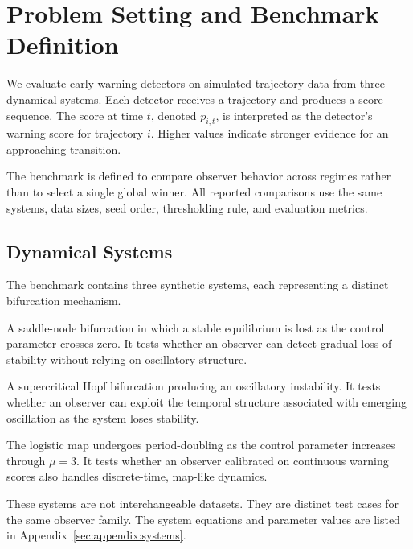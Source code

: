 \section{Problem Setting and Benchmark Definition}
\label{sec:problem}

We evaluate early-warning detectors on simulated trajectory data from three
dynamical systems. Each detector receives a trajectory and produces a score
sequence. The score at time \(t\), denoted \(p_{i,t}\), is interpreted as the
detector's warning score for trajectory \(i\). Higher values indicate stronger
evidence for an approaching transition.

The benchmark is defined to compare observer behavior across regimes rather
than to select a single global winner. All reported comparisons use the same
systems, data sizes, seed order, thresholding rule, and evaluation metrics.

\subsection{Dynamical Systems}
\label{sec:systems}

The benchmark contains three synthetic systems, each representing a distinct
bifurcation mechanism.

\begin{description}[style=unboxed,leftmargin=0pt]
  \item[Fold.]
  A saddle-node bifurcation in which a stable equilibrium is lost as the
  control parameter crosses zero. It tests whether an observer can detect
  gradual loss of stability without relying on oscillatory structure.

  \item[Hopf.]
  A supercritical Hopf bifurcation producing an oscillatory instability. It
  tests whether an observer can exploit the temporal structure associated with
  emerging oscillation as the system loses stability.

  \item[Logistic.]
  The logistic map undergoes period-doubling as the control parameter
  increases through \(\mu = 3\). It tests whether an observer calibrated on
  continuous warning scores also handles discrete-time, map-like dynamics.
\end{description}

These systems are not interchangeable datasets. They are distinct test cases
for the same observer family. The system equations and parameter values are
listed in Appendix~\ref{sec:appendix:systems}.

